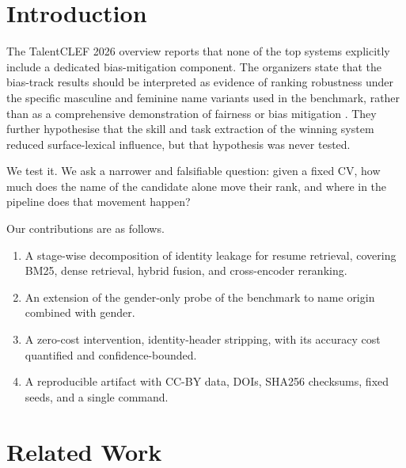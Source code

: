 \documentclass{ceurart}
\begin{document}
\maketitle

\section{Introduction}

The TalentCLEF 2026 overview reports that none of the top systems explicitly include a
dedicated bias-mitigation component. The organizers state that the bias-track results
should be interpreted as evidence of ranking robustness under the specific masculine and
feminine name variants used in the benchmark, rather than as a comprehensive demonstration
of fairness or bias mitigation \cite{gasco2026talentclef}. They further hypothesise that the
skill and task extraction of the winning system reduced surface-lexical influence, but that
hypothesis was never tested.

We test it. We ask a narrower and falsifiable question: given a fixed CV, how much does the
name of the candidate alone move their rank, and where in the pipeline does that movement
happen?

Our contributions are as follows.

\begin{enumerate}
  \item A stage-wise decomposition of identity leakage for resume retrieval, covering BM25,
  dense retrieval, hybrid fusion, and cross-encoder reranking.
  \item An extension of the gender-only probe of the benchmark to name origin combined with
  gender.
  \item A zero-cost intervention, identity-header stripping, with its accuracy cost
  quantified and confidence-bounded.
  \item A reproducible artifact with CC-BY data, DOIs, SHA256 checksums, fixed seeds, and a
  single command.
\end{enumerate}

\section{Related Work}
\end{document}
